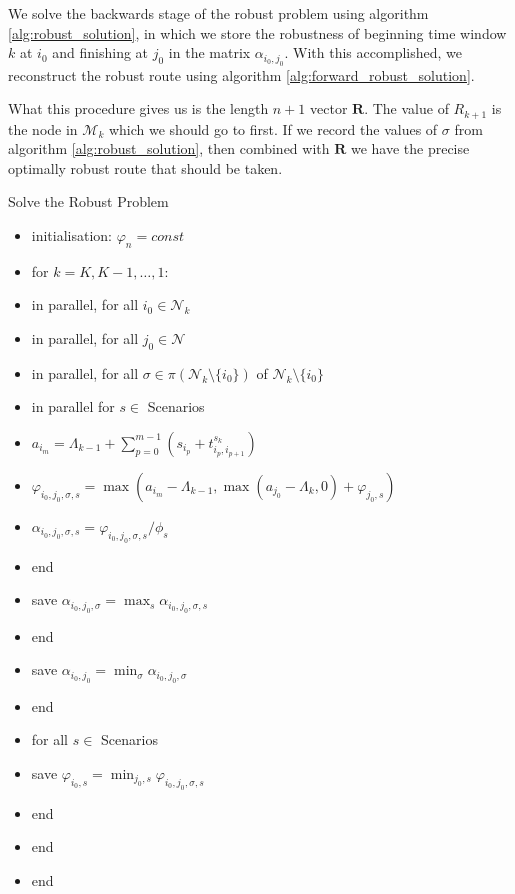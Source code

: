 We solve the backwards stage of the robust problem using algorithm \ref{alg:robust_solution}, in which we store the robustness of beginning time window $k$ at $i_0$ and finishing at $j_0$ in the matrix $\alpha_{i_0, j_0}$. With this accomplished, we reconstruct the robust route using algorithm 
\ref{alg:forward_robust_solution}.

What this procedure gives us is the length $n+1$ vector $\mathbf{R}$. The value of $R_{k+1}$ is the node in $\mathcal{M}_k$ which we should go to first. If we record the values of $\sigma$ from algorithm \ref{alg:robust_solution}, then combined with $\mathbf{R}$ we have the precise optimally robust route that should be taken.
\begin{algorithm}{Solve the Robust Problem}{}
	\label{alg:robust_solution}
	\begin{itemize}
		\item[] initialisation: $\varphi_n = const$
		\item[] for $k=K, K-1, \ldots, 1:$
		\item[] \quad in parallel, for all $i_0\in{\mathcal N}_k$
		\item[] \quad\quad in parallel, for all $j_0\in{\mathcal N}$
		\item[] \quad\quad\quad in parallel, for all $\sigma\in\pi(\mathcal{N}_k \setminus\{i_0\})$ of ${\mathcal N}_k\setminus\{i_0\}$
		\item[] \quad\quad\quad\quad in parallel for $s \in $ Scenarios
		\item[] \quad\quad\quad\quad\quad $a_{i_m}=\Lambda_{k-1}+\sum_{p=0}^{m-1}\left(s_{i_p}+t^{s_k}_{i_{p},i_{p+1}}\right)$
		\item[] \quad\quad\quad\quad\quad $\varphi_{i_0,j_0,\sigma, s}=\max(a_{i_m}-\Lambda_{k-1}, \max(a_{j_0} - \Lambda_k,0) + \varphi_{j_0, s})$
		\item[] \quad\quad\quad\quad\quad
		$\alpha_{i_0,j_0,\sigma,s } = \varphi_{i_0,j_0,\sigma, s}/\phi_s$
		\item[] \quad\quad\quad\quad end
		\item[] \quad\quad\quad\quad save $\alpha_{i_0, j_0, \sigma} = \max_s \alpha_{i_0, j_0, \sigma, s}$
		\item[] \quad\quad\quad end
		\item[] \quad\quad\quad save $ \alpha_{i_0,j_0}=\min_{\sigma}\alpha_{i_0,j_0, \sigma}$
		\item[] \quad\quad end
		\item[] \quad\quad for all $s \in $ Scenarios
		\item[] \quad\quad\quad save $\varphi_{i_0, s} = \min_{j_0, s} \varphi_{i_0, j_0, \sigma, s}$	
		\item[] \quad\quad end
		\item[] \quad end
		\item[] end
	\end{itemize}
\end{algorithm}

